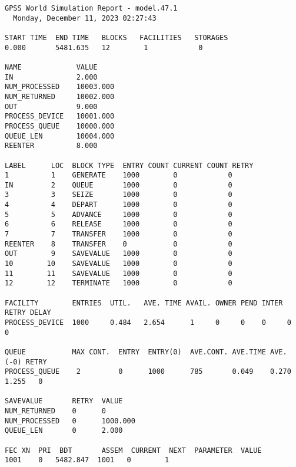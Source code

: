 \begin{lstlisting}[label=percent0,caption=Результат работы программы для процента возврата 0\%]
 GPSS World Simulation Report - model.47.1
  Monday, December 11, 2023 02:27:43  

START TIME  END TIME   BLOCKS   FACILITIES   STORAGES
0.000       5481.635   12        1            0

NAME             VALUE  
IN               2.000
NUM_PROCESSED    10003.000
NUM_RETURNED     10002.000
OUT              9.000
PROCESS_DEVICE   10001.000
PROCESS_QUEUE    10000.000
QUEUE_LEN        10004.000
REENTER          8.000

LABEL      LOC  BLOCK TYPE  ENTRY COUNT CURRENT COUNT RETRY
1          1    GENERATE    1000        0            0
IN         2    QUEUE       1000        0            0
3          3    SEIZE       1000        0            0
4          4    DEPART      1000        0            0
5          5    ADVANCE     1000        0            0
6          6    RELEASE     1000        0            0
7          7    TRANSFER    1000        0            0
REENTER    8    TRANSFER    0           0            0
OUT        9    SAVEVALUE   1000        0            0
10        10    SAVEVALUE   1000        0            0
11        11    SAVEVALUE   1000        0            0
12        12    TERMINATE   1000        0            0

FACILITY        ENTRIES  UTIL.   AVE. TIME AVAIL. OWNER PEND INTER RETRY DELAY
PROCESS_DEVICE  1000     0.484   2.654      1     0     0    0     0     0

QUEUE           MAX CONT.  ENTRY  ENTRY(0)  AVE.CONT. AVE.TIME AVE.(-0) RETRY
PROCESS_QUEUE    2         0      1000      785       0.049    0.270     1.255   0

SAVEVALUE       RETRY  VALUE
NUM_RETURNED    0      0                            
NUM_PROCESSED   0      1000.000                            
QUEUE_LEN       0      2.000

FEC XN  PRI  BDT       ASSEM  CURRENT  NEXT  PARAMETER  VALUE
1001    0   5482.847  1001   0        1
\end{lstlisting}

